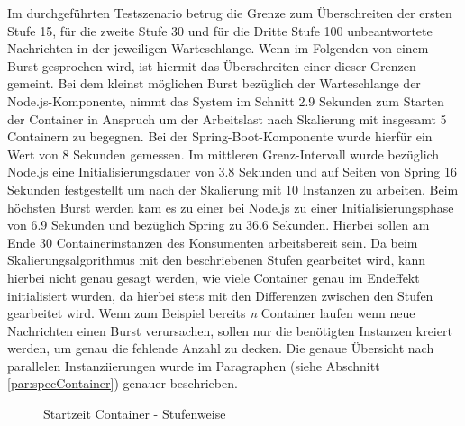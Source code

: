 Im durchgeführten Testszenario betrug die Grenze zum Überschreiten der ersten Stufe 15, für die zweite Stufe 30 und für die Dritte Stufe 100 unbeantwortete Nachrichten in der jeweiligen Warteschlange. Wenn im Folgenden von einem Burst gesprochen wird, ist hiermit das Überschreiten einer dieser Grenzen gemeint. Bei dem kleinst möglichen Burst bezüglich der Warteschlange der Node.js-Komponente, nimmt das System im Schnitt 2.9 Sekunden zum Starten der Container in Anspruch um der Arbeitslast nach Skalierung mit insgesamt 5 Containern zu begegnen. Bei der Spring-Boot-Komponente wurde hierfür ein Wert von 8 Sekunden gemessen. Im mittleren Grenz-Intervall wurde bezüglich Node.js eine Initialisierungsdauer von 3.8 Sekunden und auf Seiten von Spring 16 Sekunden festgestellt um nach der Skalierung mit 10 Instanzen zu arbeiten. Beim höchsten Burst werden kam es zu einer bei Node.js zu einer Initialisierungsphase von 6.9 Sekunden und bezüglich Spring zu 36.6 Sekunden. Hierbei sollen am Ende 30 Containerinstanzen des Konsumenten arbeitsbereit sein. Da beim Skalierungsalgorithmus mit den beschriebenen Stufen gearbeitet wird, kann hierbei nicht genau gesagt werden, wie viele Container genau im Endeffekt initialisiert wurden, da hierbei stets mit den Differenzen zwischen den Stufen gearbeitet wird. Wenn zum Beispiel bereits \emph{n} Container laufen wenn neue Nachrichten einen Burst verursachen, sollen nur die benötigten Instanzen kreiert werden, um genau die fehlende Anzahl zu decken. Die genaue Übersicht nach parallelen Instanziierungen wurde im Paragraphen (siehe Abschnitt \ref{par:specContainer}) genauer beschrieben.


\begin{figure}
  \centering
  \caption[Startzeit Container - Stufenweise]{Startzeit Container - Stufenweise}
  \label{fig:specContainers}
\end{figure}



